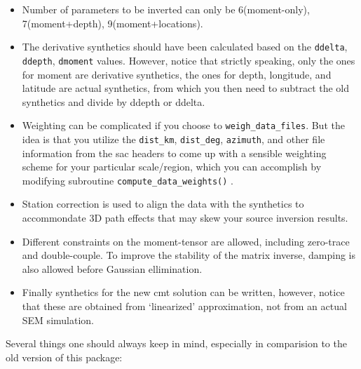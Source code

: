 \documentclass[12pt,titlepage,fleqn]{article}
\begin{document}
\begin{itemize}
 \item Number of parameters to be inverted can only be 6(moment-only), 7(moment+depth), 9(moment+locations). 
 \item The derivative synthetics should have been calculated based on the \verb=ddelta=, \verb=ddepth=, \verb=dmoment= values. However, notice that strictly speaking, only the ones for moment are derivative synthetics, the ones for depth, longitude, and latitude are actual synthetics, from which you then need to subtract the old synthetics and divide by ddepth or ddelta. 
 \item Weighting can be complicated if you choose to \verb=weigh_data_files=. But the idea is that you utilize the \verb=dist_km=, \verb=dist_deg=, \verb=azimuth=, and other file information from the sac headers to come up with a sensible weighting scheme for your particular scale/region, which you can accomplish by modifying subroutine \verb=compute_data_weights()= . 
 \item Station correction is used to align the data with the synthetics to accommondate 3D path effects that may skew your source inversion results.
 \item Different constraints on the moment-tensor are allowed, including zero-trace and double-couple. To improve the stability of the matrix inverse, damping is also allowed before Gaussian ellimination.
 \item Finally synthetics for the new cmt solution can be written, however, notice that these are obtained from `linearized' approximation, not from an actual SEM simulation.
 \end{itemize}
Several things one should always keep in mind, especially in comparision to the old version of this package:
\end{document}

